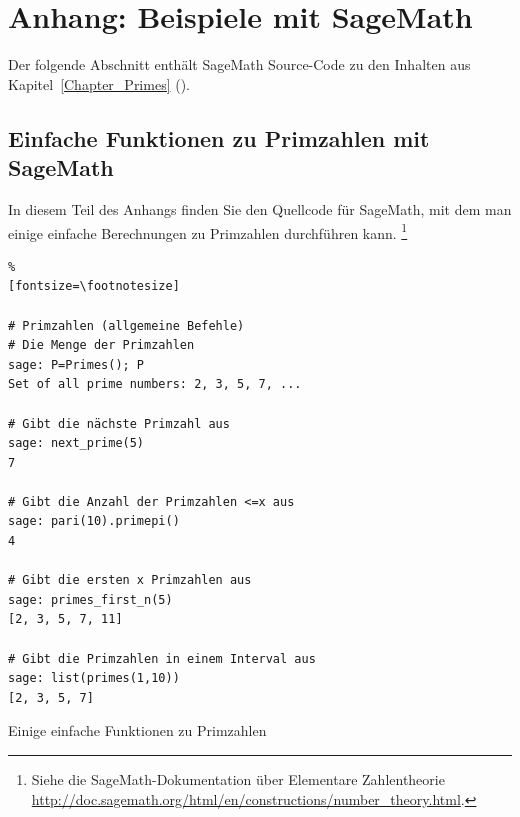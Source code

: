\begin{refsegment}
\hypertarget{primes:_Appendix_Sage-Samples}{}
\section{Anhang: Beispiele mit SageMath}
\label{primes:_Appendix_Sage-Samples}

 Der folgende Abschnitt enthält SageMath Source-Code zu den Inhalten aus
Kapitel~\ref{Chapter_Primes} (\glqq {}\grqq).


\subsection{Einfache Funktionen zu Primzahlen mit SageMath}

In diesem Teil des Anhangs finden Sie den Quellcode für SageMath, mit dem man
einige einfache Berechnungen zu Primzahlen durchführen kann.%
\footnote{Siehe die SageMath-Dokumentation über Elementare Zahlentheorie
   \url{http://doc.sagemath.org/html/en/constructions/number_theory.html}.}

\begin{sagecode}
\begin{Verbatim}%
[fontsize=\footnotesize]

# Primzahlen (allgemeine Befehle)
# Die Menge der Primzahlen
sage: P=Primes(); P
Set of all prime numbers: 2, 3, 5, 7, ...

# Gibt die nächste Primzahl aus
sage: next_prime(5)
7

# Gibt die Anzahl der Primzahlen <=x aus
sage: pari(10).primepi()
4

# Gibt die ersten x Primzahlen aus
sage: primes_first_n(5)
[2, 3, 5, 7, 11]

# Gibt die Primzahlen in einem Interval aus
sage: list(primes(1,10))
[2, 3, 5, 7]

\end{Verbatim}
\caption{Einige einfache Funktionen zu Primzahlen}
\end{sagecode}




\end{refsegment}
